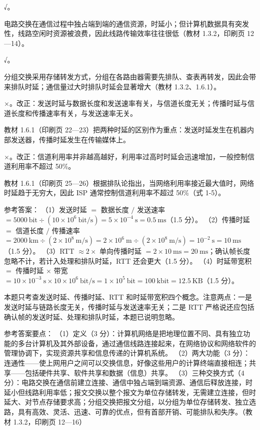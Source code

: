 \documentclass[a4paper,11pt]{article}
\begin{document}
\q √。\begin{analysis}电路交换在通信过程中独占端到端的通信资源，时延小；但计算机数据具有突发性，线路空闲时资源被浪费，因此线路传输效率往往很低（教材 1.3.2，印刷页 12—14）。\end{analysis}

\q √。\begin{analysis}分组交换采用存储转发方式，分组在各路由器需要先排队、查表再转发，因此会带来排队时延；通信量过大时排队时延会显著增大（教材 1.3.2、1.6.1）。\end{analysis}

\q ×。改正：发送时延与数据长度和发送速率有关，与信道长度无关；传播时延与信道长度和传播速率有关，与发送速率无关。\begin{analysis}教材 1.6.1（印刷页 22—23）把两种时延的区别作为重点：发送时延发生在机器内部发送器，传播时延发生在传输媒体上。\end{analysis}

\q ×。改正：信道利用率并非越高越好，利用率过高时时延会迅速增加，一般控制信道利用率不超过 50\%。\begin{analysis}教材 1.6.1（印刷页 25—26）根据排队论指出，当网络利用率接近最大值时，网络时延趋于无穷大，因此 ISP 通常控制信道利用率不超过 50\%（式 1-5）。\end{analysis}


\q 参考答案：
（1）发送时延 $=$ 数据长度 $/$ 发送速率 $=5000\ \text{bit}\div(10\times10^{6}\ \text{bit/s})=5\times10^{-4}\ \text{s}=0.5\ \text{ms}$（1.5 分）。
（2）传播时延 $=$ 信道长度 $/$ 传播速率 $=2000\ \text{km}\div(2\times10^{8}\ \text{m/s})=2\times10^{6}\ \text{m}\div(2\times10^{8}\ \text{m/s})=10^{-2}\ \text{s}=10\ \text{ms}$（1.5 分）。
（3）RTT $\approx 2\times$ 单向传播时延 $=2\times10\ \text{ms}=20\ \text{ms}$；确认帧长度忽略不计，若计入处理和排队时延，RTT 还会更大（1.5 分）。
（4）时延带宽积 $=$ 传播时延 $\times$ 带宽 $=10\times10^{-3}\ \text{s}\times10\times10^{6}\ \text{bit/s}=1\times10^{5}\ \text{bit}=100\ \text{kbit}=12.5\ \text{KB}$（1.5 分）。
\begin{analysis}本题只考查发送时延、传播时延、RTT 和时延带宽积四个概念。注意两点：一是发送时延与链路长度无关，传播时延与发送速率无关；二是 RTT 严格说还应包括确认帧的发送时延、处理和排队时延，本题已说明忽略。\end{analysis}


\q 参考答案要点：
（1）定义（3 分）：计算机网络是把地理位置不同、具有独立功能的多台计算机及其外部设备，通过通信线路连接起来，在网络协议和网络软件的管理协调下，实现资源共享和信息传递的计算机系统。
（2）两大功能（3 分）：连通性——使上网用户之间可以交换信息，好像这些用户的计算终端直接相连；共享——包括硬件共享、软件共享和数据（信息）共享。
（3）三种交换方式（4 分）：电路交换在通信前建立连接、通信中独占端到端资源、通信后释放连接，时延小但线路利用率低；报文交换以整个报文为单位存储转发，无需建立连接，但时延大、对节点存储要求高；分组交换把报文分组，以分组为单位存储转发、独立选路，具有高效、灵活、迅速、可靠的优点，但有首部开销、可能排队和失序。（教材 1.3.2，印刷页 12—16）
\end{document}
